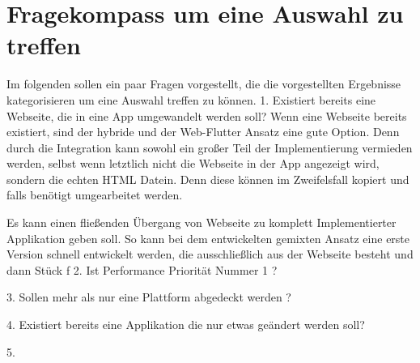 \section{Fragekompass um eine Auswahl zu treffen}
Im folgenden sollen ein paar Fragen vorgestellt, die die vorgestellten Ergebnisse kategorisieren um eine Auswahl treffen zu können.
1. Existiert bereits eine Webseite, die in eine App umgewandelt werden soll?
    Wenn eine Webseite bereits existiert, sind der hybride und der Web-Flutter Ansatz eine gute Option. Denn durch die Integration kann sowohl ein großer Teil der Implementierung vermieden werden, selbst wenn letztlich nicht die Webseite in der App angezeigt wird, sondern die echten HTML Datein. Denn diese können im Zweifelsfall kopiert und falls benötigt umgearbeitet werden.
    
    Es kann einen fließenden Übergang von Webseite zu komplett Implementierter Applikation geben soll. So kann bei dem entwickelten gemixten Ansatz eine erste Version schnell entwickelt werden, die ausschließlich aus der Webseite besteht und dann Stück f
2. Ist Performance Priorität Nummer 1 ?

3. Sollen mehr als nur eine Plattform abgedeckt werden ?

4. Existiert bereits eine Applikation die nur etwas geändert werden soll?

5. 

